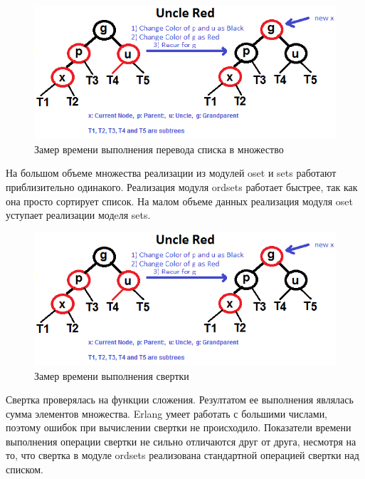 		\begin{figure}[H]
				\centering
				\includegraphics[width=\textwidth]{img/tan-aus.png}
				\caption{Замер времени выполнения перевода списка в множество}
		\end{figure}
		На большом объеме множества реализации из модулей oset и sets работают приблизительно одинакого.
		Реализация модуля ordsets работает быстрее, так как она просто сортирует список.
		На малом объеме данных реализация модуля oset уступает реализации модeля sets.
		
		\begin{figure}[H]
				\centering
				\includegraphics[width=\textwidth]{img/tan-aus.png}
				\caption{Замер времени выполнения свертки}
		\end{figure}
		Свертка проверялась на функции сложения. Резултатом ее выполнения являлась сумма элементов множества.
		Erlang умеет работать с большими числами, поэтому ошибок при вычислении свертки не происходило.
		Показатели времени выполнения операции свертки не сильно отличаются друг от друга, несмотря на то, что
		свертка в модуле ordsets реализована стандартной операцией свертки над списком. 

